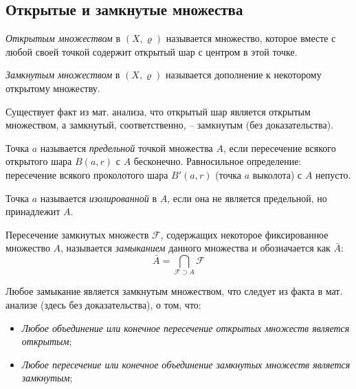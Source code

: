 \documentclass[../main.tex]{subfiles}
\begin{document}
	\subsection{Открытые и замкнутые множества}
	\begin{definition}
		\textit{Открытым множеством} в $(X, \varrho)$ называется множество, которое вместе с любой своей точкой содержит открытый шар с центром в этой точке.
	\end{definition}
	\begin{definition}
		\textit{Замкнутым множеством} в $(X, \varrho)$ называется дополнение к некоторому открытому множеству.
	\end{definition}
	\begin{remark}
		Существует факт из мат. анализа, что открытый шар является открытым множеством, а замкнутый, соответственно, -- замкнутым (без доказательства).
	\end{remark}
	\begin{definition}
		Точка $a$ называется \textit{предельной} точкой множества $A$, если пересечение всякого открытого шара $B(a, r)$ с $A$ бесконечно. Равносильное определение:
		пересечение всякого проколотого шара $B'(a, r)$ (точка $a$ выколота) с $A$ непусто.
	\end{definition}
	\begin{definition}
		Точка $a$ называется \textit{изолированной} в $A$, если она не является предельной, но принадлежит $A$.
	\end{definition}

	\begin{definition}
		Пересечение замкнутых множеств $\mathcal{F}$, содержащих некоторое фиксированное множество $A$, называется \textit{замыканием} данного множества и обозначается как $\bar{A}$:
		\[
		\bar{A}=\bigcap\limits_{\mathcal{F}\supset A} \mathcal{F}
		\]
	\end{definition}
	\begin{remark}
		Любое замыкание является замкнутым множеством, что следует из факта в мат. анализе (здесь без доказательства), о том, что:
		\begin{itemize}[label={--}]
			\item \textit{Любое объединение или конечное пересечение открытых множеств является открытым};
			\item \textit{Любое пересечение или конечное объединение замкнутых множеств является замкнутым};
		\end{itemize}
	\end{remark}
\end{document}

